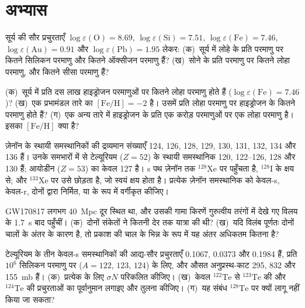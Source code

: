 \section{अभ्यास}

\begin{exercise}[$\star$]\label{exo:b3:origin-of-elements:1}
सूर्य की सौर प्रचुरताएँ $\log\varepsilon(\mathrm{O}) = 8.69$,
$\log\varepsilon(\mathrm{Si}) = 7.51$, $\log\varepsilon(\mathrm{Fe}) =
7.46$, $\log\varepsilon(\mathrm{Au}) = 0.91$ और
$\log\varepsilon(\mathrm{Pb}) = 1.95$ लेकर: (क)~सूर्य में लोहे के प्रति
परमाणु पर कितने सिलिकन परमाणु और कितने ऑक्सीजन परमाणु हैं? (ख)~सोने के प्रति
परमाणु पर कितने लोहा परमाणु, और कितने सीसा परमाणु हैं?
\end{exercise}

\begin{exercise}[$\star$]\label{exo:b3:origin-of-elements:2}
(क)~सूर्य में प्रति दस लाख हाइड्रोजन परमाणुओं पर कितने लोहा परमाणु होते हैं
($\log\varepsilon(\mathrm{Fe}) = 7.46$)? (ख)~एक प्रभामंडल तारे का
$[\mathrm{Fe/H}] = -2$ है। उसमें प्रति लोहा परमाणु पर हाइड्रोजन के कितने परमाणु होते हैं?
(ग)~एक अन्य तारे में हाइड्रोजन के प्रति एक करोड़ परमाणुओं पर एक लोहा परमाणु है।
इसका $[\mathrm{Fe/H}]$ क्या है?
\end{exercise}

\begin{exercise}[$\star$]\label{exo:b3:origin-of-elements:3}
ज़ेनॉन के स्थायी समस्थानिकों की द्रव्यमान संख्याएँ 124, 126, 128, 129, 130,
131, 132, 134 और 136 हैं। उनके समभारों में से टेल्यूरियम ($Z = 52$) के
स्थायी समस्थानिक 120, 122--126, 128 और 130 हैं; आयोडीन ($Z = 53$) का केवल 127 है।
s पथ ज़ेनॉन तक $^{128}\mathrm{Xe}$ पर पहुँचता है, $^{128}\mathrm{I}$ के
क्षय से; और $^{133}\mathrm{Xe}$ पर उसे छोड़ता है, जो स्वयं क्षय होता है।
प्रत्येक ज़ेनॉन समस्थानिक को केवल-s, केवल-r, दोनों द्वारा निर्मित, या  के रूप में वर्गीकृत कीजिए।
\end{exercise}

\begin{exercise}[$\star$]\label{exo:b3:origin-of-elements:4}
GW170817 लगभग \qty{40}{Mpc} दूर स्थित था, और उसकी गामा किरणें
गुरुत्वीय तरंगों में देखे गए विलय के \qty{1.7}{s} बाद पहुँचीं। (क)~दोनों संकेतों ने कितनी
देर तक यात्रा की थी? (ख)~यदि विलंब पूर्णतः दोनों चालों के अंतर के कारण है,
तो प्रकाश की चाल के भिन्न के रूप में यह अंतर
अधिकतम कितना है?
\end{exercise}

\begin{exercise}[$\star\star$]\label{exo:b3:origin-of-elements:5}
टेल्यूरियम के तीन केवल-s समस्थानिकों की आद्य-सौर प्रचुरताएँ
\num{0.1067}, \num{0.0373} और \num{0.1984} हैं, प्रति $10^6$ सिलिकन परमाणु पर
($A = 122$, $123$, $124$) के लिए, और औसत अनुप्रस्थ-काट \num{295},
\num{832} और \qty{155}{mb} हैं। (क)~प्रत्येक के लिए $\sigma N$ परिकलित कीजिए। (ख)~केवल
$^{122}\mathrm{Te}$ से $^{123}\mathrm{Te}$ की
और $^{124}\mathrm{Te}$ की प्रचुरताओं का पूर्वानुमान लगाइए और तुलना कीजिए। (ग)~यह संबंध
$^{128}\mathrm{Te}$ पर क्यों लागू नहीं किया जा सकता?
\end{exercise}

